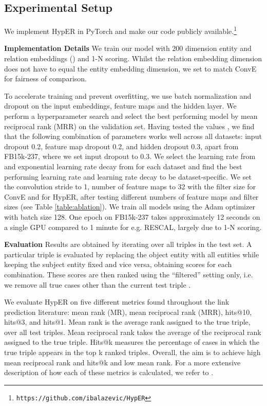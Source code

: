 \documentclass[runningheads]{llncs}
\newcommand{\keypoint}[1]{\vspace{0.1cm}\noindent\textbf{#1}\quad}
\begin{document}
\subsection{Experimental Setup}

We implement HypER in PyTorch \cite{paszke2017automatic} and make our code publicly available.\footnote{\texttt{https://github.com/ibalazevic/HypER}} 



\keypoint{Implementation Details}
We train our model with 200 dimension entity and relation embeddings () and 1-N scoring. Whilst the relation embedding dimension does not have to equal the entity embedding dimension, we set  to match ConvE for fairness of comparison.

To accelerate training and prevent overfitting, we use batch normalization \cite{ioffe2015batch} and dropout \cite{srivastava2014dropout} on the input embeddings, feature maps and the hidden layer. We perform a hyperparameter search and select the best performing model by mean reciprocal rank (MRR) on the validation set. Having tested the values , we find that the following combination of parameters works well across all datasets: input dropout 0.2, feature map dropout 0.2, and hidden dropout 0.3, apart from FB15k-237, where we set input dropout to 0.3. We select the learning rate from  and exponential learning rate decay from  for each dataset and find the best performing learning rate and learning rate decay to be dataset-specific. We set the convolution stride to 1, number of feature maps to 32 with the filter size  for ConvE and  for HypER, after testing different numbers of feature maps  and filter sizes  (see Table \ref{table:ablation}). We train all models using the Adam optimizer with batch size 128. One epoch on FB15k-237 takes approximately 12 seconds on a single GPU compared to 1 minute for e.g. RESCAL, largely due to 1-N scoring. 

\keypoint{Evaluation} Results are obtained by iterating over all triples in the test set. A particular triple is evaluated by replacing the object entity  with all entities  while keeping the subject entity  fixed and vice versa, obtaining scores for each combination. These scores are then ranked using the ``filtered'' setting only, i.e. we remove all true cases other than the current test triple \cite{bordes2013translating}.  

We evaluate HypER on five different metrics found throughout the link prediction literature: mean rank (MR), mean reciprocal rank (MRR), hits@10, hits@3, and hits@1. Mean rank is the average rank assigned to the true triple, over all test triples. Mean reciprocal rank takes the average of the reciprocal rank assigned to the true triple. Hits@k measures the percentage of cases in which the true triple appears in the top k ranked triples. Overall, the aim is to achieve high mean reciprocal rank and hits@k and low mean rank. For a more extensive description of how each of these metrics is calculated, we refer to \cite{dettmers2017convolutional}.
\end{document}

